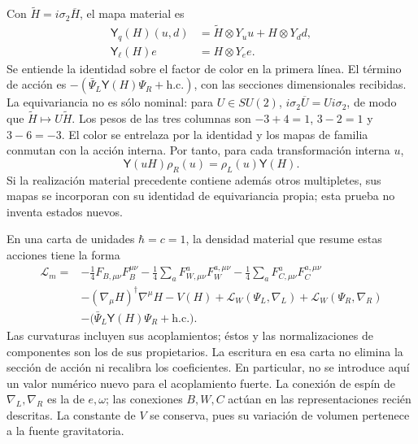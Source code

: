 Con \(\widetilde H=i\sigma_2\overline H\), el mapa material es
\begin{equation}
 \begin{split}
 \mathsf Y_q(H)(u,d)&=
       \widetilde H\otimes Y_u u+H\otimes Y_d d,\\
 \mathsf Y_\ell(H)e&=H\otimes Y_e e .
 \end{split}
 \label{hmtcuatro:yukawa}
\end{equation}
Se entiende la identidad sobre el factor de color en la primera línea.
El término de acción es
\(-(\bar\Psi_L\mathsf Y(H)\Psi_R+\mathrm{h.c.})\), con las secciones
dimensionales recibidas. La equivariancia no es sólo nominal: para
\(U\in SU(2)\), \(i\sigma_2\overline U=U i\sigma_2\), de modo que
\(\widetilde H\mapsto U\widetilde H\). Los pesos de las tres columnas
son \(-3+4=1\), \(3-2=1\) y \(3-6=-3\). El color se entrelaza por la
identidad y los mapas de familia conmutan con la acción interna.
Por tanto, para cada transformación interna \(u\),
\begin{equation}
 \mathsf Y(uH)\rho_R(u)=\rho_L(u)\mathsf Y(H).
 \label{hmtcuatro:equivariancia-yukawa}
\end{equation}
Si la realización material precedente contiene además otros
multipletes, sus mapas se incorporan con su identidad de equivariancia
propia; esta prueba no inventa estados nuevos.

En una carta de unidades \(\hbar=c=1\), la densidad material que resume
estas acciones tiene la forma
\begin{equation}
 \begin{split}
 \mathcal L_m={}&-\frac14 F_{B,\mu\nu}F_B^{\mu\nu}
 -\frac14\sum_a F_{W,\mu\nu}^aF_W^{a,\mu\nu}
 -\frac14\sum_a F_{C,\mu\nu}^aF_C^{a,\mu\nu}\\
 &-(\nabla_\mu H)^\dagger\nabla^\mu H-V(H)
 +\mathcal L_W(\Psi_L,\nabla_L)+\mathcal L_W(\Psi_R,\nabla_R)\\
 &-\bigl(\bar\Psi_L\mathsf Y(H)\Psi_R+\mathrm{h.c.}\bigr).
 \end{split}
 \label{hmtcuatro:densidad-material}
\end{equation}
Las curvaturas incluyen sus acoplamientos; éstos y las normalizaciones
de componentes son los de sus propietarios. La escritura en esa carta
no elimina la sección de acción ni recalibra los coeficientes.
En particular, no se introduce aquí un valor numérico nuevo para el
acoplamiento fuerte. La conexión de espín de \(\nabla_L,\nabla_R\)
es la de \(e,\omega\); las conexiones \(B,W,C\) actúan en las
representaciones recién descritas. La constante de \(V\) se conserva,
pues su variación de volumen pertenece a la fuente gravitatoria.

